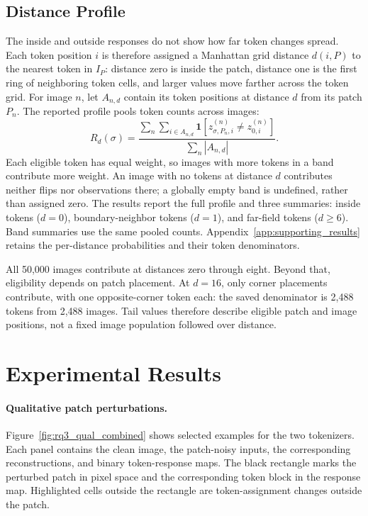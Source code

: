 \subsection{Distance Profile}
\label{subsec:rq3_distance_metrics}

The inside and outside responses do not show how far token changes spread. Each
token position $i$ is therefore assigned a Manhattan grid distance $d(i,P)$ to
the nearest token in $I_P$: distance zero is inside the patch, distance one is
the first ring of neighboring token cells, and larger values move farther
across the token grid. For image $n$, let $A_{n,d}$ contain its token
positions at distance $d$ from its patch $P_n$. The reported profile pools
token counts across images:
\begin{equation}
    R_d(\sigma)
    =
    \frac{\sum_n\sum_{i\in A_{n,d}}
    \mathbf{1}\!\left[z_{\sigma,P_n,i}^{(n)} \neq z_{0,i}^{(n)}\right]}
    {\sum_n |A_{n,d}|}.
    \label{eq:rq3_distance_profile}
\end{equation}
Each eligible token has equal weight, so images with more tokens in a band
contribute more weight. An image with no tokens at distance $d$ contributes
neither flips nor observations there; a globally empty band is undefined,
rather than assigned zero. The results report the full profile and three summaries: inside tokens
($d=0$), boundary-neighbor tokens ($d=1$), and far-field tokens ($d\geq6$).
Band summaries use the same pooled counts. Appendix~\ref{app:supporting_results}
retains the per-distance probabilities and their token denominators.

All 50,000 images contribute at distances zero through eight. Beyond that,
eligibility depends on patch placement. At $d=16$, only corner placements
contribute, with one opposite-corner token each: the saved denominator is
2,488 tokens from 2,488 images. Tail values therefore describe eligible patch
and image positions, not a fixed image population followed over distance.

\section{Experimental Results}
\label{sec:rq3_results}

\paragraph{Qualitative patch perturbations.}
\label{subsec:rq3_qualitative}

Figure~\ref{fig:rq3_qual_combined} shows selected examples for the two tokenizers. Each panel contains the clean image, the patch-noisy inputs, the corresponding reconstructions, and binary token-response maps. The black rectangle marks the perturbed patch in pixel space and the corresponding token block in the response map. Highlighted cells outside the rectangle are token-assignment changes outside the patch.

